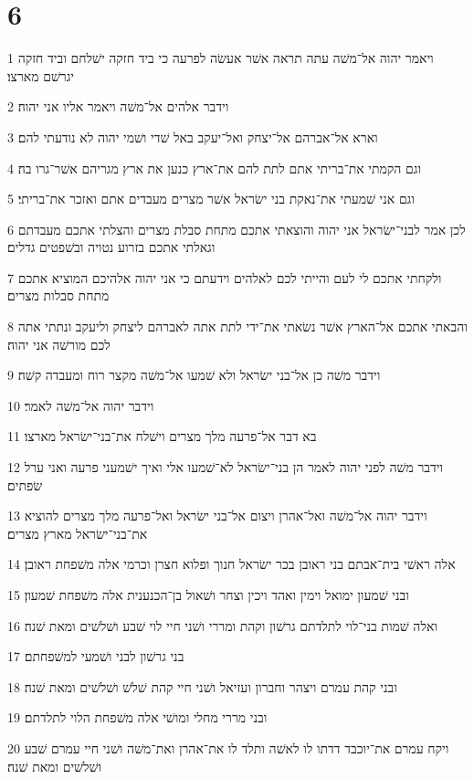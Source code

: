 \chapter{6}

\par 1 ויאמר יהוה אל־משׁה עתה תראה אשׁר אעשׂה לפרעה כי ביד חזקה ישׁלחם וביד חזקה יגרשׁם מארצו׃
\par 2 וידבר אלהים אל־משׁה ויאמר אליו אני יהוה׃
\par 3 וארא אל־אברהם אל־יצחק ואל־יעקב באל שׁדי ושׁמי יהוה לא נודעתי להם׃
\par 4 וגם הקמתי את־בריתי אתם לתת להם את־ארץ כנען את ארץ מגריהם אשׁר־גרו בה׃
\par 5 וגם אני שׁמעתי את־נאקת בני ישׂראל אשׁר מצרים מעבדים אתם ואזכר את־בריתי׃
\par 6 לכן אמר לבני־ישׂראל אני יהוה והוצאתי אתכם מתחת סבלת מצרים והצלתי אתכם מעבדתם וגאלתי אתכם בזרוע נטויה ובשׁפטים גדלים׃
\par 7 ולקחתי אתכם לי לעם והייתי לכם לאלהים וידעתם כי אני יהוה אלהיכם המוציא אתכם מתחת סבלות מצרים׃
\par 8 והבאתי אתכם אל־הארץ אשׁר נשׂאתי את־ידי לתת אתה לאברהם ליצחק וליעקב ונתתי אתה לכם מורשׁה אני יהוה׃
\par 9 וידבר משׁה כן אל־בני ישׂראל ולא שׁמעו אל־משׁה מקצר רוח ומעבדה קשׁה׃
\par 10 וידבר יהוה אל־משׁה לאמר׃
\par 11 בא דבר אל־פרעה מלך מצרים וישׁלח את־בני־ישׂראל מארצו׃
\par 12 וידבר משׁה לפני יהוה לאמר הן בני־ישׂראל לא־שׁמעו אלי ואיך ישׁמעני פרעה ואני ערל שׂפתים׃
\par 13 וידבר יהוה אל־משׁה ואל־אהרן ויצום אל־בני ישׂראל ואל־פרעה מלך מצרים להוציא את־בני־ישׂראל מארץ מצרים׃
\par 14 אלה ראשׁי בית־אבתם בני ראובן בכר ישׂראל חנוך ופלוא חצרן וכרמי אלה משׁפחת ראובן׃
\par 15 ובני שׁמעון ימואל וימין ואהד ויכין וצחר ושׁאול בן־הכנענית אלה משׁפחת שׁמעון׃
\par 16 ואלה שׁמות בני־לוי לתלדתם גרשׁון וקהת ומררי ושׁני חיי לוי שׁבע ושׁלשׁים ומאת שׁנה׃
\par 17 בני גרשׁון לבני ושׁמעי למשׁפחתם׃
\par 18 ובני קהת עמרם ויצהר וחברון ועזיאל ושׁני חיי קהת שׁלשׁ ושׁלשׁים ומאת שׁנה׃
\par 19 ובני מררי מחלי ומושׁי אלה משׁפחת הלוי לתלדתם׃
\par 20 ויקח עמרם את־יוכבד דדתו לו לאשׁה ותלד לו את־אהרן ואת־משׁה ושׁני חיי עמרם שׁבע ושׁלשׁים ומאת שׁנה׃
